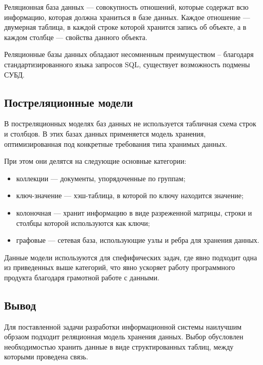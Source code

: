 Реляционная база данных \cite{db-sql} --- совокупность отношений, которые содержат всю информацию, которая должна храниться в базе данных. Каждое отношение --- двумерная таблица, в каждой строке которой хранится запись об объекте, а в каждом столбце --- свойства данного объекта.

Реляционные базы данных обладают несомненным преимуществом -- благодаря стандартизированного языка запросов SQL, существует возможность подмены СУБД.


\subsection{Постреляционные модели}

В постреляционных моделях баз данных \cite{db-nosql} не используется табличная схема строк и столбцов. В этих базах данных применяется модель хранения, оптимизированная под конкретные требования типа хранимых данных.

При этом они делятся на следующие основные категории:

\begin{itemize}
    \item коллекции --- документы, упорядоченные по группам;
    \item ключ-значение --- хэш-таблица, в которой по ключу находится значение;
    \item колоночная --- хранит информацию в виде разреженной матрицы, строки и столбцы которой используются как ключи;
    \item графовые --- сетевая база, использующие узлы и ребра для хранения данных.
\end{itemize}

Данные модели используются для спефифических задач, где явно подходит одна из приведенных выше категорий, что явно ускоряет работу программного продукта благодаря грамотной работе с данными.


\subsection*{Вывод}

Для поставленной задачи разработки информационной системы наилучшим обрзаом подходит реляционная модель хранения данных. Выбор обусловлен необходимостью хранить данные в виде структированных таблиц, между которыми проведена связь. 






